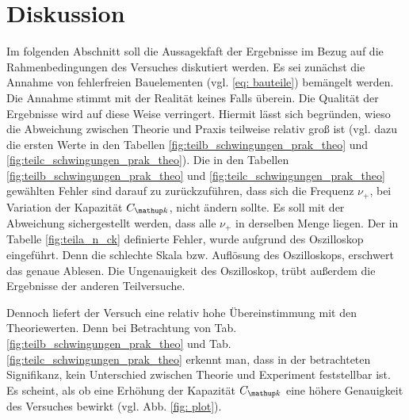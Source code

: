 \section{Diskussion}
Im folgenden Abschnitt soll die Aussagekfaft der Ergebnisse im Bezug auf
die Rahmenbedingungen des Versuches diskutiert werden.
Es sei zunächst die Annahme von fehlerfreien Bauelementen (vgl. \eqref{eq: bauteile})
bemängelt werden. Die Annahme stimmt mit der Realität keines Falls überein. %
Die Qualität der Ergebnisse wird auf diese Weise verringert.
Hiermit lässt sich begründen, wieso die Abweichung zwischen Theorie und Praxis teilweise
relativ groß ist (vgl. dazu die ersten Werte in den Tabellen \ref{fig:teilb_schwingungen_prak_theo} und \ref{fig:teilc_schwingungen_prak_theo}).
Die in den Tabellen \ref{fig:teilb_schwingungen_prak_theo} und \ref{fig:teilc_schwingungen_prak_theo} gewählten Fehler sind darauf zu
zurückzuführen, dass sich die Frequenz $\nu_+$, bei Variation der Kapazität $C\ua{k}$, nicht ändern sollte.
Es soll mit der Abweichung sichergestellt werden, dass alle $\nu_+$ in derselben Menge liegen. %
Der in Tabelle \ref{fig:teila_n_ck} definierte Fehler, wurde aufgrund des  Oszilloskop eingeführt.
Denn die schlechte Skala bzw. Auflösung des Oszilloskops, erschwert das genaue Ablesen. %
Die Ungenauigkeit des Oszilloskop, trübt außerdem  die Ergebnisse der anderen Teilversuche. %

Dennoch liefert der Versuch eine relativ hohe Übereinstimmung mit den Theoriewerten.
Denn bei Betrachtung von Tab. \ref{fig:teilb_schwingungen_prak_theo} und Tab. \ref{fig:teilc_schwingungen_prak_theo} erkennt man,  %
dass in der betrachteten Signifikanz, kein Unterschied zwischen
Theorie und Experiment feststellbar ist.
Es scheint, als ob eine Erhöhung der Kapazität $C\ua{k}$ eine höhere Genauigkeit des Versuches bewirkt (vgl. Abb. \ref{fig: plot}).
